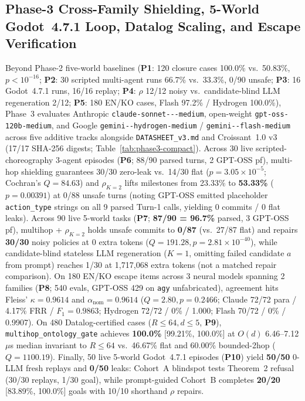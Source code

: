 \subsection{Phase-3 Cross-Family Shielding, 5-World Godot~4.7.1 Loop, Datalog Scaling, and Escape Verification}\label{sec:phase3-compact}
Beyond Phase-2 five-world baselines (\textbf{P1}: 120 closure cases 100.0\% vs.\ 50.83\%, $p{<}10^{-16}$; \textbf{P2}: 30 scripted multi-agent runs 66.7\% vs.\ 33.3\%, 0/90 unsafe; \textbf{P3}: 16 Godot~4.7.1 runs, 16/16 replay; \textbf{P4}: $\rho$ 12/12 noisy vs.\ candidate-blind LLM regeneration 2/12; \textbf{P5}: 180 EN/KO cases, Flash 97.2\% / Hydrogen 100.0\%), Phase~3 evaluates Anthropic \texttt{claude-\allowbreak sonnet---\allowbreak medium}, open-weight \texttt{gpt-\allowbreak oss-\allowbreak 120b-\allowbreak medium}, and Google \texttt{gemini--\allowbreak hydrogen-\allowbreak medium} / \texttt{gemini--\allowbreak flash-\allowbreak medium} across five additive tracks alongside \texttt{DATASHEET\_v3.md} and Croissant~1.0 v3 (17/17 SHA-256 digests; Table~\ref{tab:phase3-compact}). Across 30 live scripted-choreography 3-agent episodes (\textbf{P6}; 88/90 parsed turns, 2 GPT-OSS pf), multi-hop shielding guarantees 30/30 zero-leak vs.\ 14/30 flat ($p{=}3.05{\times}10^{-5}$; Cochran's $Q{=}84.63$) and $\rho_{K=2}$ lifts milestones from 23.33\% to \textbf{53.33\%} ($p{=}0.00391$) at 0/88 unsafe turns (noting GPT-OSS emitted placeholder \texttt{action\_type} strings on all 9 parsed Turn-1 calls, yielding 0 commits / 0 flat leaks). Across 90 live 5-world tasks (\textbf{P7}; \textbf{87/90 = 96.7\%} parsed, 3 GPT-OSS pf), multihop + $\rho_{K=2}$ holds unsafe commits to \textbf{0/87} (vs.\ 27/87 flat) and repairs \textbf{30/30} noisy policies at 0 extra tokens ($Q{=}191.28, p{=}2.81{\times}10^{-40}$), while candidate-blind stateless LLM regeneration ($K{=}1$, omitting failed candidate $a$ from prompt) reaches 1/30 at 1,717,068 extra tokens (not a matched repair comparison). On 180 EN/KO escape items across 3 neural models spanning 2 families (\textbf{P8}; 540 evals, GPT-OSS 429 on \texttt{agy} unfabricated), agreement hits Fleiss' $\kappa{=}\mathbf{0.9614}$ and $\alpha_{\mathrm{nom}}{=}\mathbf{0.9614}$ ($Q{=}2.80, p{=}0.2466$; Claude 72/72 para / 4.17\% FRR / $F_1{=}0.9863$; Hydrogen 72/72 / 0\% / 1.000; Flash 70/72 / 0\% / 0.9907). On 480 Datalog-certified cases ($R{\le}64, d{\le}5$, \textbf{P9}), \texttt{multihop\_}\allowbreak\texttt{ontology\_}\allowbreak\texttt{gate} achieves \textbf{100.0\%} [99.21\%, 100.0\%] at $O(d)$ 6.46--7.12\,$\mu$s median invariant to $R{\le}64$ vs.\ 46.67\% flat and 60.00\% bounded-2hop ($Q{=}1100.19$). Finally, 50 live 5-world Godot~4.7.1 episodes (\textbf{P10}) yield \textbf{50/50} 0-LLM fresh replays and \textbf{0/50} leaks: Cohort~A blindspot tests Theorem~2 refusal (30/30 replays, 1/30 goal), while prompt-guided Cohort~B completes \textbf{20/20} [83.89\%, 100.0\%] goals with 10/10 shorthand $\rho$ repairs.


